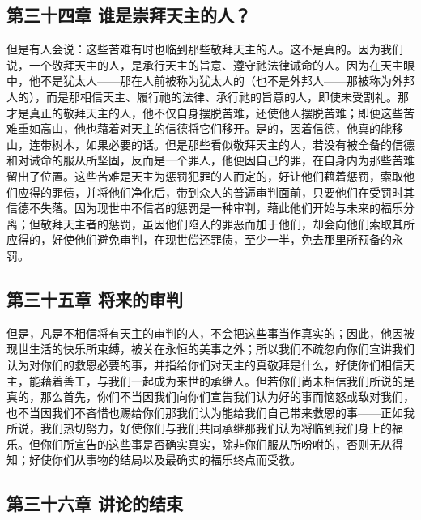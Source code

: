
\subsection{第三十四章 谁是崇拜天主的人？}

但是有人会说：这些苦难有时也临到那些敬拜天主的人。这不是真的。因为我们说，一个敬拜天主的人，是承行天主的旨意、遵守祂法律诫命的人。因为在天主眼中，他不是犹太人——那在人前被称为犹太人的（也不是外邦人——那被称为外邦人的），而是那相信天主、履行祂的法律、承行祂的旨意的人，即使未受割礼。那才是真正的敬拜天主的人，他不仅自身摆脱苦难，还使他人摆脱苦难；即便这些苦难重如高山，他也藉着对天主的信德将它们移开。是的，因着信德，他真的能移山，连带树木，如果必要的话。但是那些看似敬拜天主的人，若没有被全备的信德和对诫命的服从所坚固，反而是一个罪人，他便因自己的罪，在自身内为那些苦难留出了位置。这些苦难是天主为惩罚犯罪的人而定的，好让他们藉着惩罚，索取他们应得的罪债，并将他们净化后，带到众人的普遍审判面前，只要他们在受罚时其信德不失落。因为现世中不信者的惩罚是一种审判，藉此他们开始与未来的福乐分离；但敬拜天主者的惩罚，虽因他们陷入的罪恶而加于他们，却会向他们索取其所应得的，好使他们避免审判，在现世偿还罪债，至少一半，免去那里所预备的永罚。\par


\subsection{第三十五章 将来的审判}

但是，凡是不相信将有天主的审判的人，不会把这些事当作真实的；因此，他因被现世生活的快乐所束缚，被关在永恒的美事之外；所以我们不疏忽向你们宣讲我们认为对你们的救恩必要的事，并指给你们对天主的真敬拜是什么，好使你们相信天主，能藉着善工，与我们一起成为来世的承继人。但若你们尚未相信我们所说的是真的，那么首先，你们不当因我们向你们宣告我们认为好的事而恼怒或敌对我们，也不当因我们不吝惜也赐给你们那我们认为能给我们自己带来救恩的事——正如我所说，我们热切努力，好使你们与我们共同承继那我们认为将临到我们身上的福乐。但你们所宣告的这些事是否确实真实，除非你们服从所吩咐的，否则无从得知；好使你们从事物的结局以及最确实的福乐终点而受教。\par


\subsection{第三十六章 讲论的结束}

